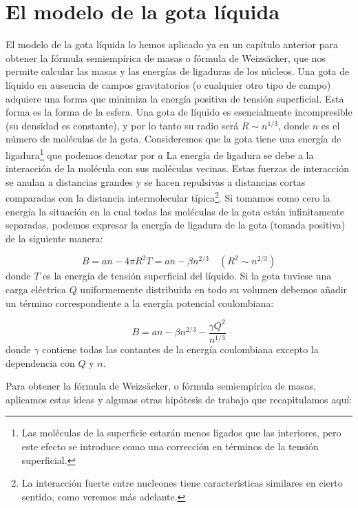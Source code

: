 \section{El modelo de la gota líquida}

El modelo de la gota líquida lo hemos aplicado ya en un capítulo anterior para obtener la fórmula semiempírica de masas o fórmula de Weizsäcker, que nos permite calcular las masas y las energías de ligaduras de los núcleos. Una gota de líquido en ausencia de campos gravitatorios (o cualquier otro tipo de campo) adquiere una forma que minimiza la energía positiva de tensión superficial. Esta forma es la forma de la esfera. Una gota de líquido es esencialmente incompresible (su densidad es constante), y por lo tanto su radio será $R\sim n^{1/3}$, donde $n$ es el número de moléculas de la gota. Consideremos que la gota tiene una energía de ligadura\footnote{Las moléculas de la superficie estarán menos ligados que las interiores, pero este efecto se introduce como una corrección en términos de la tensión superficial.}  que podemos denotar por $a$ La energía de ligadura se debe a la interacción de la molécula con sus moléculas vecinas. Estas fuerzas de interacción se anulan a distancias grandes y se hacen repulsivas a distancias cortas comparadas con la distancia intermolecular típica\footnote{La interacción fuerte entre nucleones tiene características similares en cierto sentido, como veremos más adelante.}. Si tomamos como cero la energía la situación en la cual todas las moléculas de la gota están infinitamente separadas, podemos expresar la energía de ligadura de la gota (tomada positiva) de la siguiente manera:

\begin{equation}
    B=an - 4 \pi R^2 T = an-\beta n^{2/3} \quad (R^2 \sim n^{2/3})
\end{equation}
donde $T$ es la energía de tensión superficial del líquido. Si la gota tuviese una carga eléctrica $Q$ uniformemente distribuida en todo su volumen debemos añadir un término correspondiente a la energía potencial coulombiana:

\begin{equation}
    B = an - \beta n^{2/3} - \frac{\gamma Q^2}{n^{1/3}}
\end{equation}
donde $\gamma$ contiene todas las contantes de la energía coulombiana excepto la dependencia con $Q$ y $n$. 

Para obtener la fórmula de Weizsäcker, o fórmula semiempírica de masas, aplicamos estas ideas y algunas otras hipótesis de trabajo que recapitulamos aquí:

